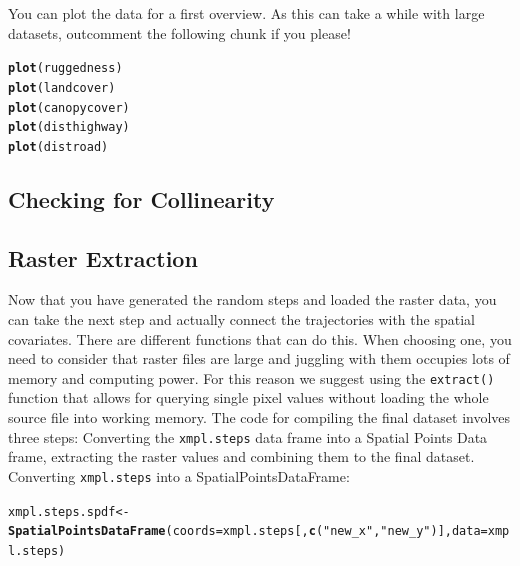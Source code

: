 \documentclass[11pt, a4paper]{article}\usepackage[]{graphicx}\usepackage[]{color}
\makeatletter
\newcommand{\hlstr}[1]{\textcolor[rgb]{0.192,0.494,0.8}{#1}}%
\newcommand{\hlstd}[1]{\textcolor[rgb]{0.345,0.345,0.345}{#1}}%
\newcommand{\hlkwb}[1]{\textcolor[rgb]{0.69,0.353,0.396}{#1}}%
\newcommand{\hlkwc}[1]{\textcolor[rgb]{0.333,0.667,0.333}{#1}}%
\newcommand{\hlkwd}[1]{\textcolor[rgb]{0.737,0.353,0.396}{\textbf{#1}}}%
\newenvironment{kframe}{%
 \def\at@end@of@kframe{}%
 \ifinner\ifhmode%
  \def\at@end@of@kframe{\end{minipage}}%
  \begin{minipage}{\columnwidth}%
 \fi\fi%
 \def\FrameCommand##1{\hskip\@totalleftmargin \hskip-\fboxsep
 \colorbox{shadecolor}{##1}\hskip-\fboxsep
     \hskip-\linewidth \hskip-\@totalleftmargin \hskip\columnwidth}%
 \MakeFramed {\advance\hsize-\width
   \@totalleftmargin\z@ \linewidth\hsize
   \@setminipage}}%
 {\par\unskip\endMakeFramed%
 \at@end@of@kframe}
\newenvironment{knitrout}{}{} %
\makeatother
\begin{document}
You can plot the data for a first overview. As this can take a while with large datasets, outcomment the following chunk if you please!
\begin{knitrout}
\color{fgcolor}\begin{kframe}
\begin{alltt}
\hlkwd{plot}\hlstd{(ruggedness)}
\hlkwd{plot}\hlstd{(landcover)}
\hlkwd{plot}\hlstd{(canopycover)}
\hlkwd{plot}\hlstd{(disthighway)}
\hlkwd{plot}\hlstd{(distroad)}
\end{alltt}
\end{kframe}
\end{knitrout}

\subsection{Checking for Collinearity}

\subsection{Raster Extraction}
Now that you have generated the random steps and loaded the raster data, you can take the next step and actually connect the trajectories with the spatial covariates. There are different functions that can do this. When choosing one, you need to consider that raster files are large and juggling with them occupies lots of memory and computing power. For this reason we suggest using the \texttt{extract()} function that allows for querying single pixel values without loading the whole source file into working memory. The code for compiling the final dataset involves three steps: Converting the \texttt{xmpl.steps} data frame into a Spatial Points Data frame, extracting the raster values and combining them to the final dataset.
Converting \texttt{xmpl.steps} into a SpatialPointsDataFrame:
\begin{knitrout}
\color{fgcolor}\begin{kframe}
\begin{alltt}
\hlstd{xmpl.steps.spdf} \hlkwb{<-} \hlkwd{SpatialPointsDataFrame}\hlstd{(}\hlkwc{coords} \hlstd{= xmpl.steps[,}\hlkwd{c}\hlstd{(}\hlstr{"new_x"}\hlstd{,}\hlstr{"new_y"}\hlstd{)],} \hlkwc{data} \hlstd{= xmpl.steps)}
\end{alltt}
\end{kframe}
\end{knitrout}
\end{document}
